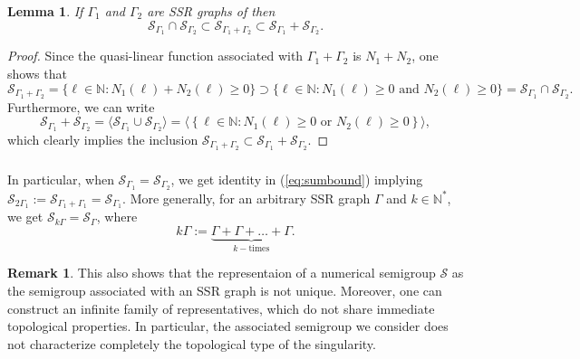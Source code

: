 \documentclass[oneside]{amsart}
\numberwithin{equation}{section}
\numberwithin{equation}{subsection}
\theoremstyle{plain}
\newtheorem{lemma}[equation]{Lemma}
\theoremstyle{definition}
\newtheorem{remark}[equation]{Remark}
\newcommand{\calS}{{\mathcal S}}\newcommand{\cals}{{\bf s}}\newcommand{\calst}{{\bf st}}\newcommand{\cS}{{\mathcal S}}
\newcommand{\Se}{\mathcal{S}}
\newcommand{\G}{\Gamma}
\newcommand{\h}[1]{\left\lbrace{#1}\right\rbrace}
\begin{document}
\begin{lemma}
    \label{thm:sumbound}
    If $\G_1$ and $\G_2$ are SSR graphs of then
    \begin{equation}
        \label{eq:sumbound}
        \Se_{\G_1}\cap\Se_{\G_2}\subset 
        \Se_{\G_1+\G_2}
        \subset\Se_{\G_1}+\Se_{\G_2}.        
    \end{equation} 
\end{lemma}
\begin{proof}
    Since the quasi-linear function 
    associated with $\G_1+\G_2$ is $N_1+N_2$, one shows that 
    $$
    \Se_{\G_1+\G_2}
    =\{\ell\in\mathbb{N}:N_1(\ell)+N_2(\ell)\ge 0\}\supset \{\ell\in\mathbb{N}:N_1(\ell)\ge 0\mbox{ and }
    N_2(\ell)\ge 0\}=  \Se_{\G_1}\cap\Se_{\G_2}.
    $$
    Furthermore, we can write  
    $$\Se_{\G_1}+\Se_{\G_2}=\langle \calS_{\G_1}\cup \calS_{\G_2}\rangle=\langle \h{\ell\in\mathbb{N} :
        N_1(\ell) \ge 0 \text{ or } N_2 (\ell)\ge 0} \rangle,$$
     which clearly implies the inclusion $\Se_{\G_1+\G_2}\subset \Se_{\G_1}+\Se_{\G_2}$.   
   \end{proof}

\subsubsection{}\label{sss:multip} In particular, when $\Se_{\G_1}=\Se_{\G_2}$, we get identity
in (\ref{eq:sumbound}) implying  
$\Se_{2\G_1}:=\Se_{\G_1+\G_1}=\Se_{\G_1}$.
More generally, for an arbitrary  SSR graph $\G$ and 
$k\in \mathbb{N}^*$, we get $\Se_{k\G}=\Se_{\G}$, where 
\[
k\G:=\underset{k-\text{times}}{\underbrace{\G+\G+\dots+\G}}.    
\]

\begin{remark}\label{rem:toprel}
This also shows that the representaion of a numerical semigroup $\Se$
as the semigroup associated with an SSR graph is not unique. Moreover, one can construct an 
infinite family of representatives, which do not share immediate topological properties.
In particular, the associated semigroup we consider does not characterize completely the topological
type of the singularity. 
\end{remark}
\end{document}
